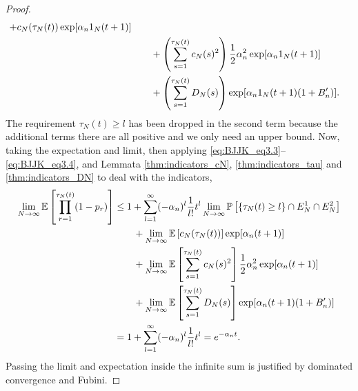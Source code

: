 \begin{proof}
\begin{align}
        + c_N(\tau_N(t)) \exp[ \alpha_n 1_N (t+1) ] \notag\\
    &\qquad+ \left( \sum_{s=1}^{\tau_N(t)} c_N(s)^2 \right)
        \frac{1}{2} \alpha_n^2 \exp[ \alpha_n 1_N (t+1) ] \notag\\
    &\qquad+ \left( \sum_{s=1}^{\tau_N(t)} D_N(s) \right)
        \exp[ \alpha_n 1_N (t+1) (1+B_n^\prime) ] . \label{eq:021}
\end{align}
The requirement $\tau_N(t) \geq l$ has been dropped in the second term because the additional terms there are all positive and we only need an upper bound.
Now, taking the expectation and limit, then applying \eqref{eq:BJJK_eq3.3}--\eqref{eq:BJJK_eq3.4}, and Lemmata \ref{thm:indicators_cN}, \ref{thm:indicators_tau} and \ref{thm:indicators_DN} to deal with the indicators,
\begin{align}
\lim_{N\to\infty} \mathbb{E} \left[ \prod_{r=1}^{\tau_N(t)} (1-p_r) \right]
&\leq 1+ \sum_{l=1}^{\infty} (-\alpha_n)^l \frac{1}{l!} t^l
        \lim_{N\to\infty} \mathbb{P} \left[ \{\tau_N(t) \geq l\} \cap E_N^1 \cap E_N^2 \right] \notag\\
    &\qquad+ \lim_{N\to\infty} \mathbb{E} \left[ c_N(\tau_N(t)) \right]
        \exp[ \alpha_n (t+1) ] \notag\\
    &\qquad+ \lim_{N\to\infty} \mathbb{E} \left[ \sum_{s=1}^{\tau_N(t)} 
        c_N(s)^2 \right]
        \frac{1}{2} \alpha_n^2 \exp[ \alpha_n (t+1) ] \notag\\
    &\qquad+ \lim_{N\to\infty} \mathbb{E} \left[ \sum_{s=1}^{\tau_N(t)} D_N(s) \right]
        \exp[ \alpha_n (t+1) (1+B_n^\prime) ] \notag\\
&= 1+ \sum_{l=1}^{\infty} (-\alpha_n)^l \frac{1}{l!} t^l
= e^{-\alpha_n t}. \label{eq:022}
\end{align}
Passing the limit and expectation inside the infinite sum is justified by dominated convergence and Fubini.


\end{proof}
